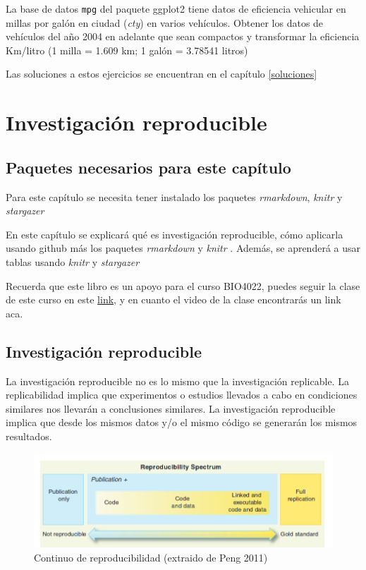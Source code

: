 \documentclass[]{book}
\begin{document}
La base de datos \texttt{mpg} del paquete ggplot2 tiene datos de
eficiencia vehicular en millas por galón en ciudad (\emph{cty}) en
varios vehículos. Obtener los datos de vehículos del año 2004 en
adelante que sean compactos y transformar la eficiencia Km/litro (1
milla = 1.609 km; 1 galón = 3.78541 litros)

Las soluciones a estos ejercicios se encuentran en el capítulo
\ref{soluciones}

\hypertarget{reproducible}{%
\chapter{Investigación reproducible}\label{reproducible}}

\hypertarget{paquetes-necesarios-para-este-capitulo-1}{%
\section{Paquetes necesarios para este
capítulo}\label{paquetes-necesarios-para-este-capitulo-1}}

Para este capítulo se necesita tener instalado los paquetes
\emph{rmarkdown}, \emph{knitr} y \emph{stargazer}

En este capítulo se explicará qué es investigación reproducible, cómo
aplicarla usando github más los paquetes \emph{rmarkdown}
\citep{Allaire2018} y \emph{knitr} \citep{xie2015}. Además, se aprenderá
a usar tablas usando \emph{knitr} \citep{xie2015} y \emph{stargazer}
\citep{hlavak2018}

Recuerda que este libro es un apoyo para el curso BIO4022, puedes seguir
la clase de este curso en este
\href{https://derek-corcoran-barrios.github.io/Clase2/Clase2InvestigacionReproducible}{link},
y en cuanto el video de la clase encontrarás un link aca.

\hypertarget{investigacion-reproducible}{%
\section{Investigación reproducible}\label{investigacion-reproducible}}

La investigación reproducible no es lo mismo que la investigación
replicable. La replicabilidad implica que experimentos o estudios
llevados a cabo en condiciones similares nos llevarán a conclusiones
similares. La investigación reproducible implica que desde los mismos
datos y/o el mismo código se generarán los mismos resultados.

\begin{figure}

{\centering \includegraphics[width=0.8\linewidth]{Reproducible} 

}

\caption{Continuo de reproducibilidad (extraido de Peng 2011)}\label{fig:reproducible}
\end{figure}
\end{document}
